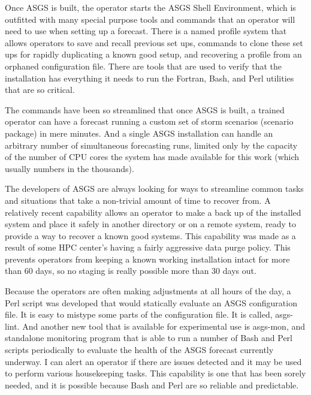 \documentclass{article}
\begin{document}
Once ASGS is built, the operator starts the ASGS Shell Environment, which is
outfitted with many special purpose tools and commands that an operator will
need to use when setting up a forecast. There is a named profile system that
allows operators to save and recall previous set ups, commands to clone these
set ups for rapidly duplicating a known good setup, and recovering a profile
from an orphaned configuration file. There are tools that are used to verify
that the installation has everything it needs to run the Fortran, Bash, and Perl
utilities that are so critical.

The commands have been so streamlined that once ASGS is built, a trained
operator can have a forecast running a custom set of storm scenarios (scenario
package) in mere minutes. And a single ASGS installation can handle an arbitrary
number of simultaneous forecasting runs, limited only by the capacity of the
number of CPU cores the system has made available for this work (which usually
numbers in the thousands).

The developers of ASGS are always looking for ways to streamline common tasks
and situations that take a non-trivial amount of time to recover from. A
relatively recent capability allows an operator to make a back up of the
installed system and place it safely in another directory or on a remote system,
ready to provide a way to recover a known good systems. This capability was made
as a result of some HPC center's having a fairly aggressive data purge policy.
This prevents operators from keeping a known working installation intact for
more than 60 days, so no staging is really possible more than 30 days out.

Because the operators are often making adjustments at all hours of the day, a
Perl script was developed that would statically evaluate an ASGS configuration
file. It is easy to mistype some parts of the configuration file. It is called,
asgs-lint. And another new tool that is available for experimental use is
asgs-mon, and standalone monitoring program that is able to run a number of Bash
and Perl scripts periodically to evaluate the health of the ASGS forecast
currently underway. I can alert an operator if there are issues detected and it
may be used to perform various housekeeping tasks. This capability is one that
has been sorely needed, and it is possible because Bash and Perl are so reliable
and predictable.
\end{document}
